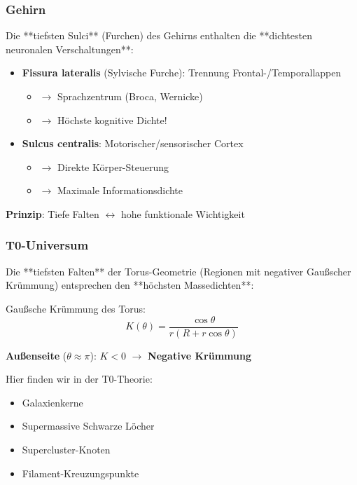 	\subsubsection{Gehirn}
	
	Die **tiefsten Sulci** (Furchen) des Gehirns enthalten die **dichtesten neuronalen Verschaltungen**:
	
	\begin{itemize}
		\item \textbf{Fissura lateralis} (Sylvische Furche): Trennung Frontal-/Temporallappen
		\begin{itemize}
			\item $\to$ Sprachzentrum (Broca, Wernicke)
			\item $\to$ Höchste kognitive Dichte!
		\end{itemize}
		\item \textbf{Sulcus centralis}: Motorischer/sensorischer Cortex
		\begin{itemize}
			\item $\to$ Direkte Körper-Steuerung
			\item $\to$ Maximale Informationsdichte
		\end{itemize}
	\end{itemize}
	
	\textbf{Prinzip}: Tiefe Falten $\leftrightarrow$ hohe funktionale Wichtigkeit
	
	\subsubsection{T0-Universum}
	
	Die **tiefsten Falten** der Torus-Geometrie (Regionen mit negativer Gaußscher Krümmung) entsprechen den **höchsten Massedichten**:
	
	Gaußsche Krümmung des Torus:
	\begin{equation}
		K(\theta) = \frac{\cos\theta}{r(R + r\cos\theta)}
	\end{equation}
	
	\textbf{Außenseite} ($\theta \approx \pi$): $K < 0$ $\to$ \textbf{Negative Krümmung}
	
	Hier finden wir in der T0-Theorie:
	\begin{itemize}
		\item Galaxienkerne
		\item Supermassive Schwarze Löcher
		\item Supercluster-Knoten
		\item Filament-Kreuzungspunkte
	\end{itemize}
	
